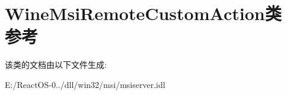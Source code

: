 \hypertarget{class_wine_msi_remote_custom_action}{}\section{Wine\+Msi\+Remote\+Custom\+Action类 参考}
\label{class_wine_msi_remote_custom_action}


该类的文档由以下文件生成\+:\begin{DoxyCompactItemize}
\item 
E\+:/\+React\+O\+S-\/0../dll/win32/msi/msiserver.\+idl\end{DoxyCompactItemize}
